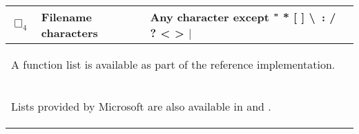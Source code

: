 \begin{tabular}{@{}llll@{}}
	$\Box_4$ & Filename characters & Any character except " * [ ] \textbackslash\ : / ? < > $\mid$ \\
	\bottomrule
	\multicolumn{4}{l}{\begin{footnotesize}\textsuperscript{\number\value{footnote}} A function list is available as part of the reference implementation.\end{footnotesize}}\\
	\multicolumn{4}{l}{\begin{footnotesize} \hspace{0.5em} Lists provided by Microsoft are also available in \cite{ExcelFunctionReference} and \cite{ExcelOfficialGrammar}.\end{footnotesize}}\\
	
\end{tabular}

